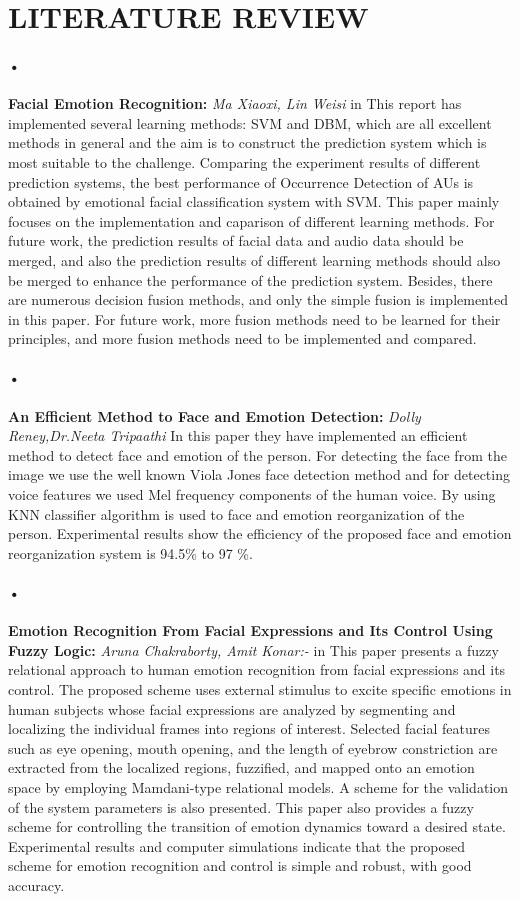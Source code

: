 \documentclass[a4paper,12pt,oneside]{article}
\begin{document}
\newpage
\section{LITERATURE REVIEW}
\paragraph{•}
\textbf{Facial Emotion Recognition:}
\textit{Ma Xiaoxi, Lin Weisi }
in This report has implemented several learning methods:
SVM and DBM, which are all excellent methods in general
and the aim is to construct the prediction system which is
most suitable to the challenge. Comparing the experiment
results of different prediction systems, the best performance
of Occurrence Detection of AUs is obtained by emotional facial classification system with SVM. This paper mainly
focuses on the implementation and caparison of different
learning methods. For future work, the prediction results of
facial data and audio data should be merged, and also the
prediction results of different learning methods should also
be merged to enhance the performance of the prediction
system. Besides, there are numerous decision fusion methods,
and only the simple fusion is implemented in this paper. For
future work, more fusion methods need to be learned for
their principles, and more fusion methods need to be
implemented and compared.
\paragraph{•}
\textbf{An Efficient Method to Face and Emotion Detection:}
\textit{Dolly Reney,Dr.Neeta Tripaathi }
In this paper they have implemented an efficient method to detect
face and emotion of the person. For detecting the face from
the image we use the well known Viola Jones face detection
method and for detecting voice features we used Mel
frequency components of the human voice. By using KNN
classifier algorithm is used to face and emotion
reorganization of the person. Experimental results show the
efficiency of the proposed face and emotion reorganization
system is 94.5\% to 97 \%.
\paragraph{•}
\textbf{Emotion Recognition From Facial Expressions and
Its Control Using Fuzzy Logic:}
\textit{Aruna Chakraborty, Amit Konar:-}
in This paper presents a fuzzy relational approach to
human emotion recognition from facial expressions and its control.
The proposed scheme uses external stimulus to excite specific
emotions in human subjects whose facial expressions are analyzed
by segmenting and localizing the individual frames into regions
of interest. Selected facial features such as eye opening, mouth
opening, and the length of eyebrow constriction are extracted
from the localized regions, fuzzified, and mapped onto an emotion
space by employing Mamdani-type relational models. A scheme
for the validation of the system parameters is also presented. This
paper also provides a fuzzy scheme for controlling the transition
of emotion dynamics toward a desired state. Experimental results
and computer simulations indicate that the proposed scheme for
emotion recognition and control is simple and robust, with good
accuracy.
\end{document}
